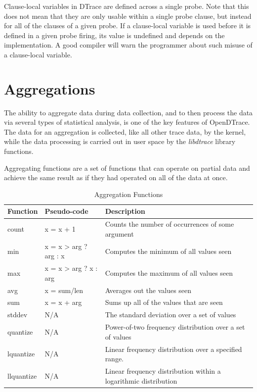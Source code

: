 Clause-local variables in DTrace are defined across a single probe. Note that
this does not mean that they are only usable within a single probe clause, but
instead for all of the clauses of a given probe. If a clause-local variable is
used before it is defined in a given probe firing, its value is undefined and
depends on the implementation. A good compiler will warn the programmer about
such misuse of a clause-local variable.

\section{Aggregations}
\label{sec:aggregations}

The ability to aggregate data during data collection, and to then
process the data via several types of statistical analysis, is one of
the key features of OpenDTrace.  The data for an aggregation is
collected, like all other trace data, by the kernel, while the data
processing is carried out in user space by the \emph{libdtrace}
library functions.

Aggregating functions are a set of functions that can operate on
partial data and achieve the same result as if they had operated
on all of the data at once.

\begin{table}
  \centering
  \begin{tabular}{l|l|l}
    Function & Pseudo-code & Description \\
    \hline
    count & x = x + 1 & Counts the number of occurrences of some argument \\
    min & x = x > arg ? arg : x & Computes the minimum of all values seen \\
    max & x = x > arg ? x : arg & Computes the maximum of all values seen \\
    avg & x = sum/len & Averages out the values seen \\
    sum & x = x + arg & Sums up all of the values that are seen \\
    stddev & N/A & The standard deviation over a set of values\\
    quantize & N/A & Power-of-two frequency distribution over a set of values\\
    lquantize & N/A & Linear frequency distribution over a specified range.\\
    llquantize & N/A & Linear frequency distribution within a logarithmic distribution
  \end{tabular}
  \caption{Aggregation Functions}
  \label{tab:agg-func}
\end{table}

